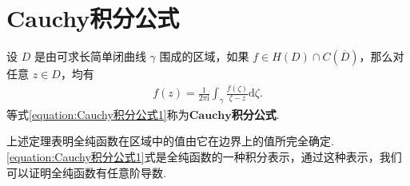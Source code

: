 \documentclass[../../main.tex]{subfiles}%
\begin{document}
\section{Cauchy积分公式}

\begin{theorem}[Cauchy积分公式]\label{theorem:定理3.4.1}
设 \( D \) 是由可求长简单闭曲线 \( \gamma \) 围成的区域，如果 \( f \in H(D) \cap C(\overline{D}) \)，那么对任意 \( z \in D \)，均有
\begin{align}\label{equation:Cauchy积分公式1}
f(z) = \frac{1}{2\pi \mathrm{i}} \int_{\gamma} \frac{f(\zeta)}{\zeta - z} \mathrm{d}\zeta.
\end{align}
等式\eqref{equation:Cauchy积分公式1}称为$\mathbf{Cauchy}$\textbf{积分公式}.
\end{theorem}
\begin{note}
上述定理表明全纯函数在区域中的值由它在边界上的值所完全确定. \eqref{equation:Cauchy积分公式1}式是全纯函数的一种积分表示，通过这种表示，我们可以证明全纯函数有任意阶导数.
\end{note}
\end{document}
